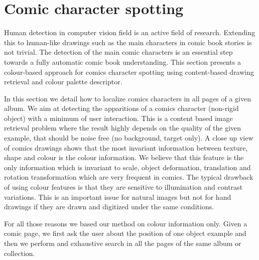 


\section{Comic character spotting}
\label{sec:in:character_spotting}
Human detection in computer vision field is an active field of research. Extending this to human-like drawings such as the main characters in comic book stories is not trivial.
The detection of the main comic characters is an essential step towards a fully automatic comic book understanding.
This section presents a colour-based approach for comics character spotting using content-based drawing retrieval and colour palette descriptor.

In this section we detail how to localize comics characters in all pages of a given album.
We aim at detecting the apparitions of a comics character (non-rigid object) with a minimum of user interaction. This is a content based image retrieval problem where the result highly depends on the quality of the given example, that should be noise free (no background, target only). 
A close up view of comics drawings shows that the most invariant information between texture, shape and colour is the colour information. We believe that this feature is the only information which is invariant to scale, object deformation, translation and rotation transformation which are very frequent in comics. The typical drawback of using colour features is that they are sensitive to illumination and contrast variations. This is an important issue for natural images but not for hand drawings if they are drawn and digitized under the same conditions. 

For all those reasons we based our method on colour information only.
Given a comic page, we first ask the user about the position of one object example and then we perform and exhaustive search in all the pages of the same album or collection.

